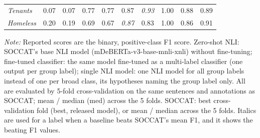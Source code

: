 \begin{table}[htb]
\begin{threeparttable}
\begin{tabular}{l c c c c c c c c c}
\textit{Tenants} & 0.07 & 0.07 & 0.77 & 0.77 & 0.87 & \textit{0.93} & 1.00 & 0.88 & 0.89 \\
\textit{Homeless} & 0.20 & 0.19 & 0.69 & 0.67 & \textit{0.87} & 0.83 & 1.00 & 0.86 & 0.91 \\
\bottomrule
\end{tabular}
\begin{tablenotes}[flushleft]
\footnotesize
\item \textit{Note:} Reported scores are the binary, positive-class F1 score. Zero-shot NLI: SOCCAT's base NLI model (mDeBERTa-v3-base-mnli-xnli) without fine-tuning; fine-tuned classifier: the same model fine-tuned as a multi-label classifier (one output per group label); single NLI model: one NLI model for all group labels instead of one per broad class, its hypotheses naming the group label only. All are evaluated by 5-fold cross-validation on the same sentences and annotations as SOCCAT; mean / median (med) across the 5 folds. SOCCAT: best cross-validation fold (best, released model), or mean / median across the 5 folds. Italics are used for a label when a baseline beats SOCCAT's mean F1, and it shows the beating F1 values.
\end{tablenotes}
\end{threeparttable}
\end{table}